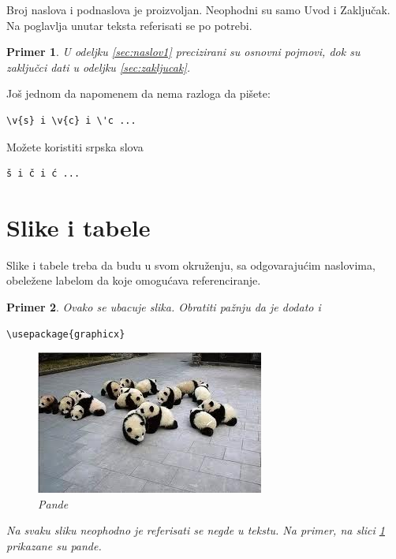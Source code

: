 \documentclass[a4paper]{article}
\newtheorem{primer}{Primer}[section]
\begin{document}
Broj naslova i podnaslova je proizvoljan. Neophodni su samo Uvod i Zaključak. Na poglavlja unutar teksta referisati se po potrebi.
\begin{primer}
U odeljku \ref{sec:naslov1} precizirani su osnovni pojmovi, dok su zaključci dati u odeljku \ref{sec:zakljucak}.
\end{primer}

Još jednom da napomenem da nema razloga da pišete:
\begin{verbatim}
\v{s} i \v{c} i \'c ...
\end{verbatim}
Možete koristiti srpska slova
\begin{verbatim}
š i č i ć ...
\end{verbatim}



\section{Slike i tabele}
\label{slike_i_tabele}

Slike i tabele treba da budu u svom okruženju, sa odgovarajućim naslovima, obeležene labelom da koje omogućava referenciranje.

\begin{primer} Ovako se ubacuje slika. Obratiti pažnju da je dodato i
\begin{verbatim}
\usepackage{graphicx}
\end{verbatim}

\begin{figure}[h!]
\begin{center}
\includegraphics[scale=0.75]{panda.jpg}
\end{center}
\caption{Pande}
\label{fig:pande}
\end{figure}

Na svaku sliku neophodno je referisati se negde u tekstu. Na primer, na slici \ref{fig:pande} prikazane su pande.
\end{primer}
\end{document}
